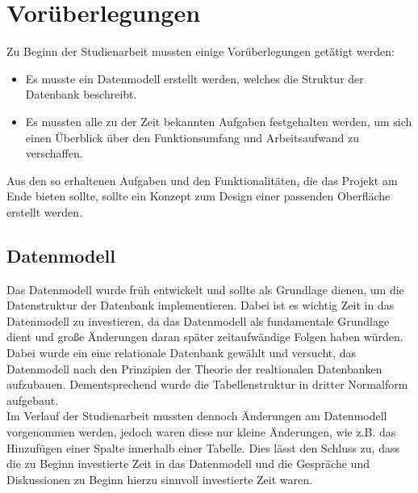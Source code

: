 \chapter{Vorüberlegungen}
Zu Beginn der Studienarbeit mussten einige Vorüberlegungen getätigt werden:
\begin{itemize}
  \item Es musste ein Datenmodell erstellt werden, welches die Struktur der Datenbank beschreibt.
  \item Es mussten alle zu der Zeit bekannten Aufgaben festgehalten werden, um sich einen Überblick über den Funktionsumfang und Arbeitsaufwand zu verschaffen.
\end{itemize}
Aus den so erhaltenen Aufgaben und den Funktionalitäten, die das Projekt am Ende bieten sollte, sollte ein Konzept zum Design einer passenden Oberfläche erstellt werden. 

\section{Datenmodell}
Das Datenmodell wurde früh entwickelt und sollte als Grundlage dienen, um die Datenstruktur der Datenbank implementieren. 
Dabei ist es wichtig Zeit in das Datenmodell zu investieren, da das Datenmodell als fundamentale Grundlage dient und große Änderungen daran später zeitaufwändige Folgen haben würden.
Dabei wurde ein eine relationale Datenbank gewählt und versucht, das Datenmodell nach den Prinzipien der Theorie der realtionalen Datenbanken aufzubauen.
Dementsprechend wurde die Tabellenstruktur in dritter Normalform aufgebaut.\\
Im Verlauf der Studienarbeit mussten dennoch Änderungen am Datenmodell vorgenommen werden, jedoch waren diese nur kleine Änderungen, wie z.B. das Hinzufügen einer Spalte innerhalb einer Tabelle.
Dies lässt den Schluss zu, dass die zu Beginn investierte Zeit in das Datenmodell und die Gespräche und Diskussionen zu Beginn hierzu sinnvoll investierte Zeit waren.

